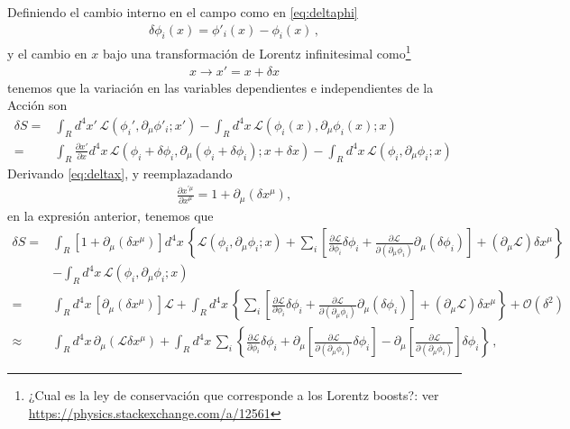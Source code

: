 \begin{frame}
Definiendo el cambio interno en el campo como en \eqref{eq:deltaphi}
\begin{align}
  \delta\phi_i(x)=\phi'_i(x)-\phi_i(x)\,,
\end{align}
y el cambio en $x$ bajo una transformación de Lorentz infinitesimal como\footnote{¿Cual es la ley de conservación que corresponde a los Lorentz boosts?: ver \url{https://physics.stackexchange.com/a/12561}}
\begin{align}
\label{eq:deltax}
  x\to x'=x+\delta x
\end{align}
tenemos que la variación en las variables dependientes e independientes de la Acción son
\begin{align}
   \delta S=&\int_{R}d^4x'\,\mathcal{L} \left( \phi_{i}',\partial_{\mu}\phi'_i;x' \right)- \int_{R}d^4x\,\mathcal{L} \left( \phi_{i}(x),\partial_{\mu}\phi_i(x);x \right) \nonumber\\
     =&\int_{R}\frac{\partial x'}{\partial x}d^4x\,\mathcal{L} \left( \phi_{i}+\delta\phi_i,\partial_{\mu}(\phi_i+\delta\phi_i);x+\delta x \right)- \int_{R}d^4x\,\mathcal{L} \left( \phi_{i},\partial_{\mu}\phi_i;x \right)\,
\end{align}
Derivando \eqref{eq:deltax}, y reemplazadando
\begin{align}
  \frac{\partial x^{\prime \mu}}{\partial x^{\mu}}=1+\partial_{\mu} \left( \delta x^{\mu} \right),
\end{align}
en la expresión anterior, tenemos que
\begin{align}
     \delta S =&\int_{R} \left[ 1+\partial_{\mu} \left( \delta x^{\mu}  \right)\right]  d^4x\,\left\{ \mathcal{L}(\phi_i,\partial_{\mu}\phi_i;x)+\sum_i \left[ \frac{\partial\mathcal{L}}{\partial\phi_i}\delta\phi_{i} +\frac{\partial\mathcal{L}}{\partial(\partial_{\mu}\phi_i)}\partial_{\mu}(\delta\phi_{i}) \right]+\left( \partial_{\mu}\mathcal{L} \right)\delta x^{\mu} \right\}\nonumber\\
      &- \int_{R}d^4x\,\mathcal{L} \left( \phi_{i},\partial_{\mu}\phi_i;x \right) \nonumber\\
     =&\int_{R} d^4x\,\left[ \partial_{\mu} \left( \delta x^{\mu}  \right)\right] \mathcal{L} + \int_{R}d^4x\,\left\{\sum_i \left[ \frac{\partial\mathcal{L}}{\partial\phi_i}\delta\phi_{i} +\frac{\partial\mathcal{L}}{\partial(\partial_{\mu}\phi_i)}\partial_{\mu}(\delta\phi_{i}) \right]+\left( \partial_{\mu}\mathcal{L} \right)\delta x^{\mu} \right\}+\mathcal{O} \left( \delta^2 \right)\nonumber\\
     \approx&\int_{R} d^4x\,\partial_{\mu} \left(\mathcal{L} \delta x^{\mu}  \right)  + \int_{R}d^4x\,\sum_i \left\{ \frac{\partial\mathcal{L}}{\partial\phi_i}\delta\phi_{i} +\partial_{\mu} \left[ \frac{\partial\mathcal{L}}{\partial(\partial_{\mu}\phi_i)}\delta\phi_{i} \right]-\partial_{\mu} \left[ \frac{\partial\mathcal{L}}{\partial(\partial_{\mu}\phi_i)}\right]\delta\phi_{i}  \right\}\,,

\end{align}
\end{frame}
